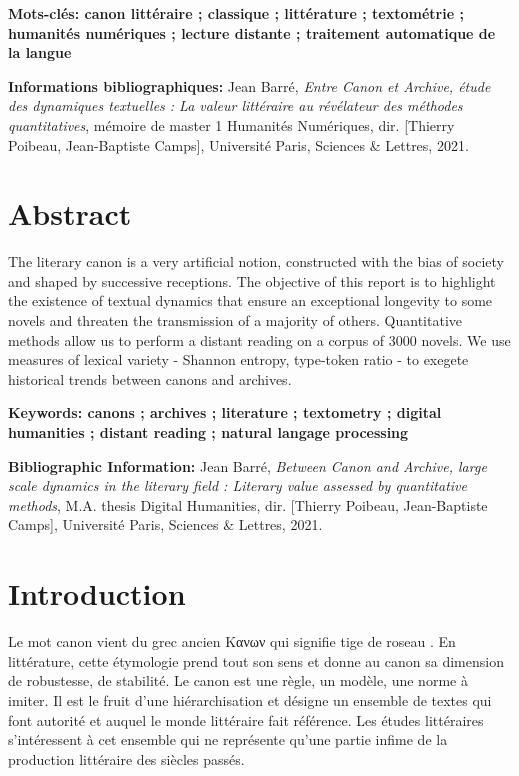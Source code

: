 \documentclass[a4paper,twoside,12pt]{book}
\begin{document}
\medskip

\textbf{Mots-clés: canon littéraire ; classique ; littérature ; textométrie ; humanités numériques ; lecture distante ; traitement automatique de la langue}

\textbf{Informations bibliographiques:} Jean Barré, \textit{Entre Canon et Archive, étude des dynamiques textuelles : La valeur littéraire au révélateur des méthodes quantitatives}, mémoire de master 1 \og Humanités Numériques\fg{}, dir. [Thierry Poibeau, Jean-Baptiste Camps], Université Paris, Sciences \& Lettres, 2021.


\section*{Abstract}
The literary canon is a very artificial notion, constructed with the bias of society and shaped by successive receptions. The objective of this report is to highlight the existence of textual dynamics that ensure an exceptional longevity to some novels and threaten the transmission of a majority of others. Quantitative methods allow us to perform a distant reading on a corpus of 3000 novels. We use measures of lexical variety - Shannon entropy, type-token ratio - to exegete historical trends between canons and archives. 

\medskip

\textbf{Keywords: canons ; archives ; literature ; textometry ; digital humanities ; distant reading ; natural langage processing}

\textbf{Bibliographic Information:} Jean Barré, \textit{Between Canon and Archive, large scale dynamics in the literary field : Literary value assessed by quantitative methods}, M.A. thesis \og Digital Humanities\fg{}, dir. [Thierry Poibeau, Jean-Baptiste Camps], Université Paris, Sciences \& Lettres, 2021.



\mainmatter

\newpage

\tableofcontents

\newpage

\section*{Introduction}
Le mot canon vient du grec ancien \foreignlanguage{greek}{Κανων} qui signifie \og tige de roseau \fg. En littérature, cette étymologie prend tout son sens et donne au canon sa dimension de robustesse, de stabilité. Le canon est une règle, un modèle, une norme à imiter. Il est le fruit d'une hiérarchisation et désigne un ensemble de textes qui font autorité et auquel le monde littéraire fait référence. Les études littéraires s'intéressent à cet ensemble qui ne représente qu'une partie infime de la production littéraire des siècles passés.
\end{document}
